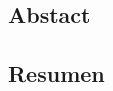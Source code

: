 \documentclass[12pt, letterpaper, oneside]{book}
\begin{document}
\frontmatter
\thispagestyle{empty}

\newpage


\chapter*{ }
\vspace{-3cm}
\section*{Abstact} 
\section*{Resumen}

\begin{spacing}{1}
\tableofcontents {}
\listoftables
\listoffigures
\end{spacing}

\mainmatter



\end{document}
